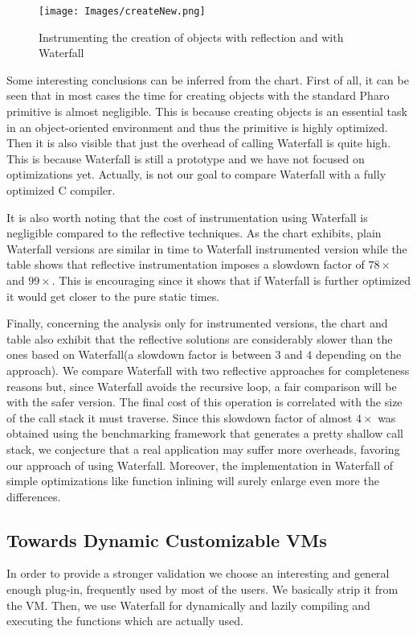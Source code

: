 \documentclass[10pt,preprint,letter]{sigplanconf}
\newcommand{\PH}  {Pharo\xspace}
\newcommand{\W}{Waterfall\xspace}
\begin{document}
\begin{figure}[H]
\begin{center}
	\texttt{[image: Images/createNew.png]} 
	\caption{Instrumenting the creation of objects with reflection and with \W}
	\label{fig:comparisonnew}
\end{center}
\end{figure}

Some interesting conclusions can be inferred from the chart.
First of all, it can be seen that in most cases the time for creating objects with the standard \PH primitive is almost negligible. This is because creating objects is an essential task in an object-oriented environment and thus the primitive is highly optimized. Then it is also visible that just the overhead of calling \W is quite high. This is because \W is still a prototype and we have not focused on optimizations yet. Actually, is not our goal to compare \W with a fully optimized C compiler.

It is also worth noting that the cost of instrumentation using \W is negligible compared to the reflective techniques. As the chart exhibits, plain \W versions are similar in time to \W instrumented version while the table shows that reflective instrumentation imposes a slowdown factor of $78\times$ and $99\times$. 
This is encouraging since it shows that if \W is further optimized it would get closer to the pure static times. 

Finally, concerning the analysis only for instrumented versions, the chart and table also exhibit that the reflective solutions are considerably slower than the ones based on \W (a slowdown factor is between $3$ and $4$ depending on the approach).
We compare \W with two reflective approaches for completeness reasons but, since \W avoids the recursive loop, a fair comparison will be with the safer version. 
The final cost of this operation is correlated with the size of the call stack it must traverse. Since this slowdown factor of almost $4\times$ was obtained using the benchmarking framework that generates a pretty shallow call stack, we conjecture that a real application may suffer more overheads, favoring our approach of using  \W. 
Moreover, the implementation in \W of simple optimizations like function inlining will surely enlarge even more the differences.

\subsection{Towards Dynamic Customizable VMs}
In order to provide a stronger validation  we choose an interesting and general enough plug-in, frequently used by most of the users. 
We  basically strip it from the VM. Then, we use \W for dynamically and lazily compiling and executing the functions which are actually used. 
\end{document}
